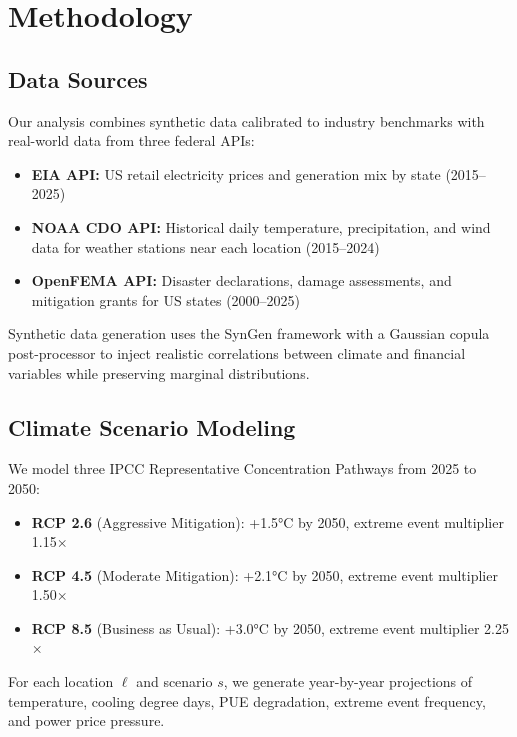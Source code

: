 \documentclass[12pt,a4paper]{article}
\begin{document}
\section{Methodology}
\label{sec:methodology}

\subsection{Data Sources}

Our analysis combines synthetic data calibrated to industry benchmarks with real-world data from three federal APIs:

\begin{itemize}
    \item \textbf{EIA API:} US retail electricity prices and generation mix by state (2015--2025)
    \item \textbf{NOAA CDO API:} Historical daily temperature, precipitation, and wind data for weather stations near each location (2015--2024)
    \item \textbf{OpenFEMA API:} Disaster declarations, damage assessments, and mitigation grants for US states (2000--2025)
\end{itemize}

Synthetic data generation uses the SynGen framework with a Gaussian copula post-processor to inject realistic correlations between climate and financial variables while preserving marginal distributions.

\subsection{Climate Scenario Modeling}

We model three IPCC Representative Concentration Pathways from 2025 to 2050:

\begin{itemize}
    \item \textbf{RCP 2.6} (Aggressive Mitigation): +1.5°C by 2050, extreme event multiplier 1.15$\times$
    \item \textbf{RCP 4.5} (Moderate Mitigation): +2.1°C by 2050, extreme event multiplier 1.50$\times$
    \item \textbf{RCP 8.5} (Business as Usual): +3.0°C by 2050, extreme event multiplier 2.25$\times$
\end{itemize}

For each location $\ell$ and scenario $s$, we generate year-by-year projections of temperature, cooling degree days, PUE degradation, extreme event frequency, and power price pressure.
\end{document}

